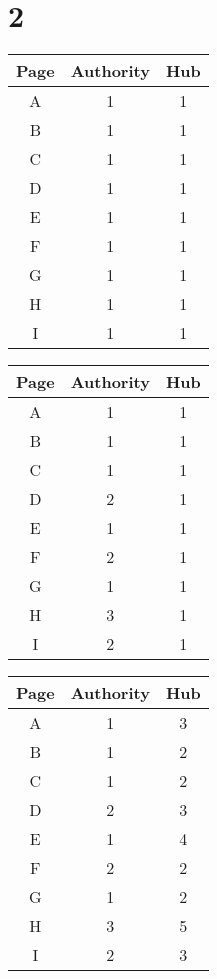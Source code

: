 \documentclass[12pt,english]{article}
\begin{document}
\section*{2}
\begin{minipage}[c]{0.5\textwidth}
\centering
\begin{tabular}{|c|c|c|}
\hline
 Page & Authority & Hub \\
\hline
 A & 1 & 1 \\ 
 B & 1 & 1 \\
 C & 1 & 1 \\ 
 D & 1 & 1 \\
 E & 1 & 1 \\ 
 F & 1 & 1 \\
 G & 1 & 1 \\ 
 H & 1 & 1 \\
 I & 1 & 1 \\
\hline
\end{tabular}
\end{minipage}

\begin{minipage}[c]{0.5\textwidth}
\centering
\begin{tabular}{|c|c|c|}
\hline
 Page & Authority & Hub \\
\hline
 A & 1 & 1 \\ 
 B & 1 & 1 \\
 C & 1 & 1 \\ 
 D & 2 & 1 \\
 E & 1 & 1 \\ 
 F & 2 & 1 \\
 G & 1 & 1 \\ 
 H & 3 & 1 \\
 I & 2 & 1 \\
\hline
\end{tabular}
\end{minipage}

\begin{minipage}[c]{0.5\textwidth}
\centering
\begin{tabular}{|c|c|c|}
\hline
 Page & Authority & Hub \\
\hline
 A & 1 & 3 \\ 
 B & 1 & 2 \\
 C & 1 & 2 \\ 
 D & 2 & 3 \\
 E & 1 & 4 \\ 
 F & 2 & 2 \\
 G & 1 & 2 \\ 
 H & 3 & 5 \\
 I & 2 & 3 \\
\hline
\end{tabular}
\end{minipage}
\end{document}
